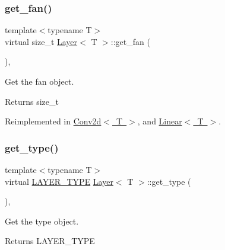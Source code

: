 \mbox{\label{class_layer_a43681206a2ef690667c41423b6b6f20b}} 
\subsubsection{\texorpdfstring{get\_fan()}{get\_fan()}}
{\footnotesize\ttfamily template$<$typename T$>$ \\
virtual size\+\_\+t \mbox{\hyperlink{class_layer}{Layer}}$<$ T $>$\+::get\+\_\+fan (\begin{DoxyParamCaption}{ }\end{DoxyParamCaption})\hspace{0.3cm}{\ttfamily [inline]}, {\ttfamily [virtual]}}



Get the fan object. 

\begin{DoxyReturn}{Returns}
size\+\_\+t 
\end{DoxyReturn}


Reimplemented in \mbox{\hyperlink{class_conv2d_a6eeedff6c4d0864a4c3788e06e82a2e4}{Conv2d$<$ T $>$}}, and \mbox{\hyperlink{class_linear_a753a7cb02a0b18e8922d23db905eb534}{Linear$<$ T $>$}}.

\mbox{\label{class_layer_a9a59bb1bd6e1880abc71d9afbfb96496}} 
\subsubsection{\texorpdfstring{get\_type()}{get\_type()}}
{\footnotesize\ttfamily template$<$typename T$>$ \\
virtual \mbox{\hyperlink{layer__base_8hpp_a5f7e99058765b058df158c099200b154}{L\+A\+Y\+E\+R\+\_\+\+T\+Y\+PE}} \mbox{\hyperlink{class_layer}{Layer}}$<$ T $>$\+::get\+\_\+type (\begin{DoxyParamCaption}{ }\end{DoxyParamCaption})\hspace{0.3cm}{\ttfamily [inline]}, {\ttfamily [virtual]}}



Get the type object. 

\begin{DoxyReturn}{Returns}
L\+A\+Y\+E\+R\+\_\+\+T\+Y\+PE 
\end{DoxyReturn}
\mbox{\label{class_layer_a16eecfdfbd98cb94918b7d19ecaeb740}} 
